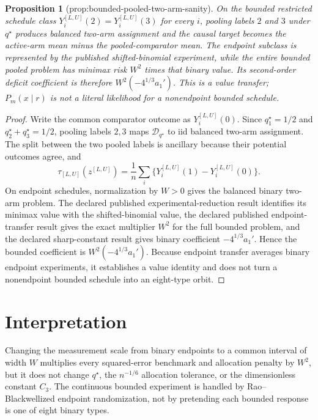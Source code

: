 \documentclass{article}
\newtheorem{proposition}{Proposition}
\begin{document}
\begin{proposition}[prop:bounded-pooled-two-arm-sanity]\label{prop:bounded-pooled-two-arm-sanity}
On the bounded restricted schedule class
\(Y_i^{[L,U]}(2)=Y_i^{[L,U]}(3)\) for every \(i\), pooling labels \(2\) and \(3\) under \(q^\star\) produces balanced two-arm assignment and the causal target becomes the active-arm mean minus the pooled-comparator mean.  The endpoint subclass is represented by the published shifted-binomial experiment, while the entire bounded pooled problem has minimax risk \(W^2\) times that binary value.  Its second-order deficit coefficient is therefore \(W^2(-4^{1/3}a_1')\).  This is a value transfer; \(P_m(x\mid r)\) is not a literal likelihood for a nonendpoint bounded schedule.
\end{proposition}
\begin{proof}
Write the common comparator outcome as \(Y_i^{[L,U]}(0)\).  Since \(q_1^\star=1/2\) and \(q_2^\star+q_3^\star=1/2\), pooling labels \(2,3\) maps \(\mathcal D_{q^\star}\) to iid balanced two-arm assignment.  The split between the two pooled labels is ancillary because their potential outcomes agree, and
\[
\tau_{[L,U]}(z^{[L,U]})
=\frac1n\sum_i\{Y_i^{[L,U]}(1)-Y_i^{[L,U]}(0)\}.
\]
On endpoint schedules, normalization by \(W>0\) gives the balanced binary two-arm problem.  The declared published experimental-reduction result identifies its minimax value with the shifted-binomial value, the declared published endpoint-transfer result gives the exact multiplier \(W^2\) for the full bounded problem, and the declared sharp-constant result gives binary coefficient \(-4^{1/3}a_1'\).  Hence the bounded coefficient is \(W^2(-4^{1/3}a_1')\).  Because endpoint transfer averages binary endpoint experiments, it establishes a value identity and does not turn a nonendpoint bounded schedule into an eight-type orbit.
\end{proof}

\section{Interpretation}

Changing the measurement scale from binary endpoints to a common interval of width \(W\) multiplies every squared-error benchmark and allocation penalty by \(W^2\), but it does not change \(q^\star\), the \(n^{-1/6}\) allocation tolerance, or the dimensionless constant \(C_3\). The continuous bounded experiment is handled by Rao--Blackwellized endpoint randomization, not by pretending each bounded response is one of eight binary types.
\end{document}
